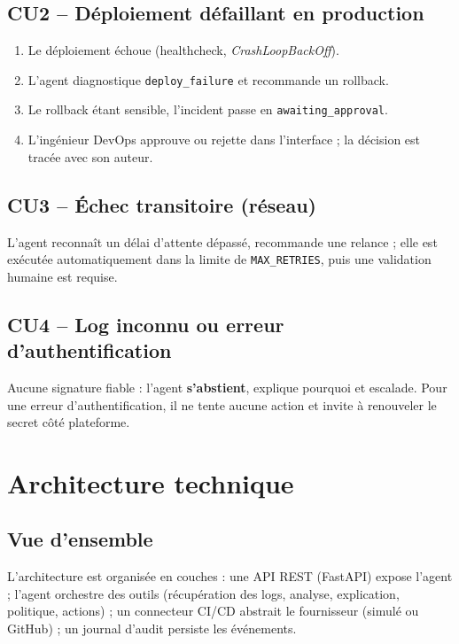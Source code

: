 \documentclass[11pt,a4paper]{article}
\newcommand{\code}[1]{\texttt{#1}}
\begin{document}
\subsection{CU2 -- Déploiement défaillant en production}
\begin{enumerate}
\item Le déploiement échoue (healthcheck, \emph{CrashLoopBackOff}).
\item L'agent diagnostique \code{deploy\_failure} et recommande un rollback.
\item Le rollback étant sensible, l'incident passe en \code{awaiting\_approval}.
\item L'ingénieur DevOps approuve ou rejette dans l'interface ; la décision est tracée avec son auteur.
\end{enumerate}

\subsection{CU3 -- Échec transitoire (réseau)}
L'agent reconnaît un délai d'attente dépassé, recommande une relance ; elle est exécutée
automatiquement dans la limite de \code{MAX\_RETRIES}, puis une validation humaine est requise.

\subsection{CU4 -- Log inconnu ou erreur d'authentification}
Aucune signature fiable : l'agent \textbf{s'abstient}, explique pourquoi et escalade. Pour une erreur d'authentification,
il ne tente aucune action et invite à renouveler le secret côté plateforme.

\section{Architecture technique}
\subsection{Vue d'ensemble}
L'architecture est organisée en couches : une API REST (FastAPI) expose l'agent ; l'agent
orchestre des outils (récupération des logs, analyse, explication, politique, actions) ; un
connecteur CI/CD abstrait le fournisseur (simulé ou GitHub) ; un journal d'audit persiste les événements.
\end{document}
